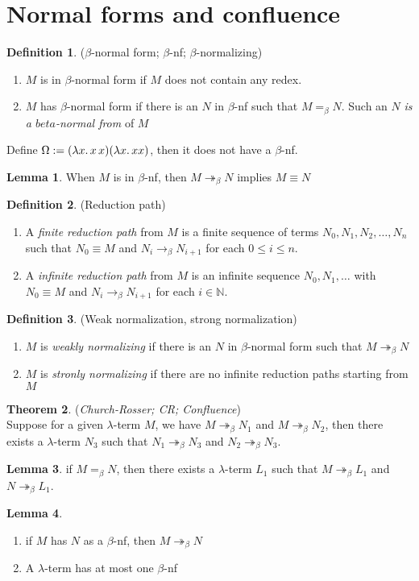 \documentclass[a4paper]{book}
\theoremstyle{definition}
\newtheorem{definition}{Definition}[section]
\newtheorem{lemma}{Lemma}[section]
\newtheorem{theorem}[lemma]{Theorem}
\newcommand{\lterm}{$\lambda$-term }
\newcommand{\bnf}{\(\beta\)-nf}
\newcommand{\beq}{=_\beta}
\newcommand{\obr}{\rightarrow_\beta}
\newcommand{\mbr}{\twoheadrightarrow_\beta}
\begin{document}
\section{Normal forms and confluence}
\begin{definition}
  (\(\beta\)-normal form; \(\beta\)-nf; \(\beta\)-normalizing)
  \begin{enumerate}
    \item \(M\) is in \(\beta\)-normal form if \(M\) does not
          contain any redex.
    \item \(M\) has \(\beta\)-normal form if there is an
          \(N\) in \(\beta\)-nf such that \(M \beq N\).
          Such an \(N\) \textit{is a \(beta\)-normal from} of \(M\)
  \end{enumerate}
\end{definition}
Define \(\Omega := (\lambda x\ldotp x\, x)(\lambda x\ldotp xx)\), then it
does not have a \(\beta\)-nf.
\begin{lemma}
  When \(M\) is in \(\beta\)-nf, then \(M \mbr N\) implies
  \(M \equiv N\)
\end{lemma}
\begin{definition}
  (Reduction path)
  \begin{enumerate}
    \item A \textit{finite reduction path} from \(M\) is a finite
          sequence of terms \(N_0, N_1, N_2, \ldots, N_n\) such that
          \(N_0 \equiv M\) and \(N_i \obr N_{i+1}\) for each
          \(0 \leq i \leq n\).
    \item A \textit{infinite reduction path} from \(M\) is an
          infinite sequence \(N_0, N_1, \ldots\) with \(N_0 \equiv M\)
          and \(N_i \obr N_{i+1}\) for each \(i \in \mathbb{N}\).
  \end{enumerate}
\end{definition}
\begin{definition}
  (Weak normalization, strong normalization)
  \begin{enumerate}
    \item \(M\) is \textit{weakly normalizing} if there is an \(N\)
          in \(\beta\)-normal form such that \(M \mbr N\)
    \item \(M\) is \textit{stronly normalizing} if there are
          no infinite reduction paths starting from \(M\)
  \end{enumerate}
\end{definition}
\begin{theorem}
  (\textit{Church-Rosser; CR; Confluence})\\
  Suppose for a given \lterm \(M\), we have \(M \mbr N_1\) and
  \(M \mbr N_2\), then there exists a \lterm \(N_3\) such that
  \(N_1 \mbr N_3\) and \(N_2 \mbr N_3\).
\end{theorem}
\begin{lemma}
  if \(M \beq N\), then there exists a \lterm  \(L_1\) such that 
  \(M \mbr L_1\) and \(N \mbr L_1\).
\end{lemma}
\begin{lemma}
  \begin{enumerate}
    \item if \(M\) has \(N\) as a \bnf, then \(M \mbr N\)
    \item A \lterm has at most one \bnf
  \end{enumerate}
\end{lemma}
\end{document}
